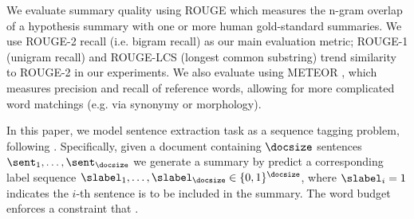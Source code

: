 We evaluate summary quality using ROUGE \cite{lin2004rouge} 
which measures the n-gram
overlap of a hypothesis summary with one or more human gold-standard summaries.
We use ROUGE-2 recall (i.e. bigram recall) as our main evaluation metric;
ROUGE-1 (unigram recall) and ROUGE-LCS (longest common substring) trend similarity to ROUGE-2 in our experiments.
We also evaluate using METEOR \cite{denkowski:lavie:meteor-wmt:2014},
which measures precision and recall of reference words, allowing for
more complicated word matchings (e.g. via synonymy or morphology).

In this paper, we model sentence extraction task as a sequence tagging problem, following \cite{} .
Specifically, given a document containing $\docsize$ sentences $\sent_1, \ldots, 
\sent_{\docsize}$ we generate a summary by predict a corresponding label sequence $\slabel_1,
\ldots, \slabel_{\docsize} \in \{0, 1\}^{\docsize}$, where $\slabel_i = 1$ 
indicates the $i$-th sentence is to be included in the summary.
The word budget enforces a constraint that .

